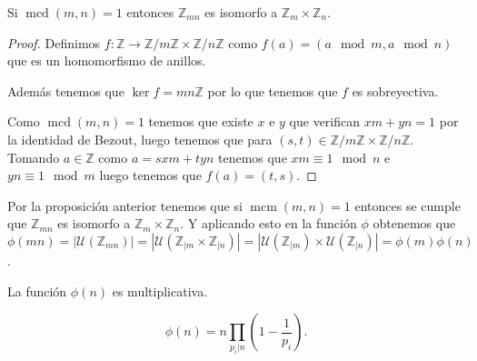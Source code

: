 \begin{proposicion}
		Si $\operatorname{mcd}(m,n)=1$ entonces $\mathbb{Z}_{mn}$ es isomorfo a $\mathbb{Z}_m\times\mathbb{Z}_n$.
\end{proposicion}
\begin{proof}
		Definimos $f:\mathbb{Z}\rightarrow\mathbb{Z}/m\mathbb{Z}\times\mathbb{Z}/n\mathbb{Z}$ como $f(a)=(a\mod m, a\mod n)$ que es un homomorfismo de anillos.

		Además tenemos que $\ker f=mn\mathbb{Z}$ por lo que tenemos que $f$ es sobreyectiva.
		
		Como $\operatorname{mcd}(m,n) = 1$ tenemos que existe $x$ e $y$ que verifican $xm+yn=1$ por la identidad de Bezout, luego tenemos que para $(s,t)\in \mathbb{Z}/m\mathbb{Z}\times\mathbb{Z}/n\mathbb{Z}$. Tomando $a \in \mathbb{Z}$ como $a=sxm+tyn$ tenemos que $xm \equiv 1 \mod n$ e $yn \equiv 1 \mod m$ luego tenemos que $f(a)=(t,s)$.
\end{proof}

Por la proposición anterior tenemos que si $\operatorname{mcm}(m,n)=1$ entonces se cumple que $\mathbb{Z}_{mn}$ es isomorfo a $\mathbb{Z}_m\times\mathbb{Z}_n$. Y aplicando esto en la función $\phi$ obtenemos que $\phi(mn)=|\mathcal{U}(\mathbb{Z}_{mn})|=|\mathcal{U}(\mathbb{Z}_{|m}\times\mathbb{Z}_{|n})|=|\mathcal{U}(\mathbb{Z}_{|m})\times\mathcal{U}(\mathbb{Z}_{|n})|=\phi(m)\phi(n)$.

\begin{corolario}
	La función $\phi(n)$ es multiplicativa.
\end{corolario}

\begin{corolario}
	 $$\phi(n)=n\prod_{p_i|n}\left(1-\frac{1}{p_i}\right).$$ 
\end{corolario}

